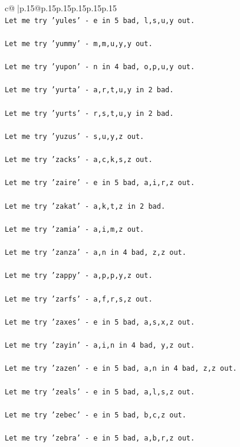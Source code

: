 \documentclass{article}
\begin{document}
{\begin{supertabular}{c@{$\;$}|p{.15\linewidth}@{}p{.15\linewidth}p{.15\linewidth}p{.15\linewidth}p{.15\linewidth}p{.15\linewidth}}
{{{\\ 
\texttt{Let me try 'yules' {-} e in 5 bad, l,s,u,y out. } \\
\\ 
\texttt{Let me try 'yummy' {-} m,m,u,y,y out. } \\
\\ 
\texttt{Let me try 'yupon' {-} n in 4 bad, o,p,u,y out. } \\
\\ 
\texttt{Let me try 'yurta' {-} a,r,t,u,y in 2 bad. } \\
\\ 
\texttt{Let me try 'yurts' {-} r,s,t,u,y in 2 bad. } \\
\\ 
\texttt{Let me try 'yuzus' {-} s,u,y,z out. } \\
\\ 
\texttt{Let me try 'zacks' {-} a,c,k,s,z out. } \\
\\ 
\texttt{Let me try 'zaire' {-} e in 5 bad, a,i,r,z out. } \\
\\ 
\texttt{Let me try 'zakat' {-} a,k,t,z in 2 bad. } \\
\\ 
\texttt{Let me try 'zamia' {-} a,i,m,z out. } \\
\\ 
\texttt{Let me try 'zanza' {-} a,n in 4 bad, z,z out. } \\
\\ 
\texttt{Let me try 'zappy' {-} a,p,p,y,z out. } \\
\\ 
\texttt{Let me try 'zarfs' {-} a,f,r,s,z out. } \\
\\ 
\texttt{Let me try 'zaxes' {-} e in 5 bad, a,s,x,z out. } \\
\\ 
\texttt{Let me try 'zayin' {-} a,i,n in 4 bad, y,z out. } \\
\\ 
\texttt{Let me try 'zazen' {-} e in 5 bad, a,n in 4 bad, z,z out. } \\
\\ 
\texttt{Let me try 'zeals' {-} e in 5 bad, a,l,s,z out. } \\
\\ 
\texttt{Let me try 'zebec' {-} e in 5 bad, b,c,z out. } \\
\\ 
\texttt{Let me try 'zebra' {-} e in 5 bad, a,b,r,z out. } \\
}}}
\end{supertabular}}
\end{document}
